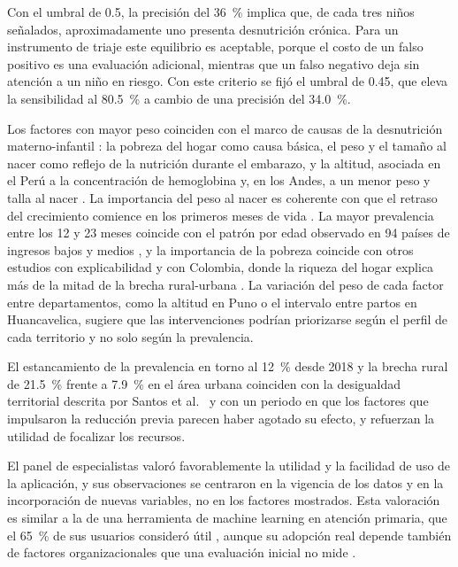 \documentclass[final,5p,times,twocolumn,number,lefttitle]{elsarticle}
\begin{document}
Con el umbral de 0.5, la precisión del 36~\% implica que, de cada tres niños señalados, aproximadamente uno presenta desnutrición crónica. Para un instrumento de triaje este equilibrio es aceptable, porque el costo de un falso positivo es una evaluación adicional, mientras que un falso negativo deja sin atención a un niño en riesgo. Con este criterio se fijó el umbral de 0.45, que eleva la sensibilidad al 80.5~\% a cambio de una precisión del 34.0~\%.

Los factores con mayor peso coinciden con el marco de causas de la desnutrición materno-infantil \citep{black2013lancet,victora2021lancet}: la pobreza del hogar como causa básica, el peso y el tamaño al nacer como reflejo de la nutrición durante el embarazo, y la altitud, asociada en el Perú a la concentración de hemoglobina \citep{accinelli2020anemia} y, en los Andes, a un menor peso y talla al nacer \citep{martinez2019altitude}. La importancia del peso al nacer es coherente con que el retraso del crecimiento comience en los primeros meses de vida \citep{benjaminchung2023faltering}. La mayor prevalencia entre los 12 y 23 meses coincide con el patrón por edad observado en 94 países de ingresos bajos y medios \citep{karlsson2023age}, y la importancia de la pobreza coincide con otros estudios con explicabilidad \citep{yehuala2026xai} y con Colombia, donde la riqueza del hogar explica más de la mitad de la brecha rural-urbana \citep{cardenas2022colombia}. La variación del peso de cada factor entre departamentos, como la altitud en Puno o el intervalo entre partos en Huancavelica, sugiere que las intervenciones podrían priorizarse según el perfil de cada territorio y no solo según la prevalencia.

El estancamiento de la prevalencia en torno al 12~\% desde 2018 y la brecha rural de 21.5~\% frente a 7.9~\% en el área urbana coinciden con la desigualdad territorial descrita por Santos et al.~\citep{santos2021peru} y con un periodo en que los factores que impulsaron la reducción previa \citep{huicho2020peru} parecen haber agotado su efecto, y refuerzan la utilidad de focalizar los recursos.

El panel de especialistas valoró favorablemente la utilidad y la facilidad de uso de la aplicación, y sus observaciones se centraron en la vigencia de los datos y en la incorporación de nuevas variables, no en los factores mostrados. Esta valoración es similar a la de una herramienta de machine learning en atención primaria, que el 65~\% de sus usuarios consideró útil \citep{herter2026cdss}, aunque su adopción real depende también de factores organizacionales que una evaluación inicial no mide \citep{ji2021framework}.
\end{document}
